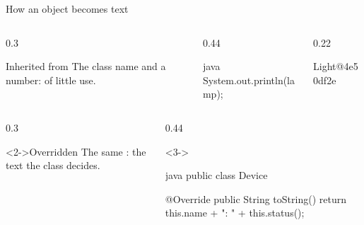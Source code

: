 \documentclass[\deckoptions]{beamer}
\begin{document}
\begin{frame}[fragile]{}{How an object becomes text}
  \begin{boxrow}
  \begin{columns}[c, onlytextwidth]
    \begin{column}{0.3\textwidth}
      \begin{card}{Inherited from }
        The class name and a number: of little use.
      \end{card}
    \end{column}
    \begin{column}{0.44\textwidth}
\begin{codeblock}[dense]{java}
System.out.println(lamp);
\end{codeblock}
    \end{column}
    \begin{column}{0.22\textwidth}
\begin{console}[dense]
Light@4e50df2e
\end{console}
    \end{column}
  \end{columns}
  \end{boxrow}
  \boxrowgap
  \begin{boxrow}
  \begin{columns}[c, onlytextwidth]
    \begin{column}{0.3\textwidth}
      \begin{card}<2->{Overridden}
        The same : the text the class decides.
      \end{card}
    \end{column}
    \begin{column}{0.44\textwidth}
      \begin{uncoverenv}<3->
\begin{codeblock}[dense]{java}
public class Device {
    @Override
    public String toString() {
        return this.name + ": " + this.status();
    }

}
\end{codeblock}
\end{uncoverenv}
\end{column}
\end{columns}
\end{boxrow}
\end{frame}
\end{document}
